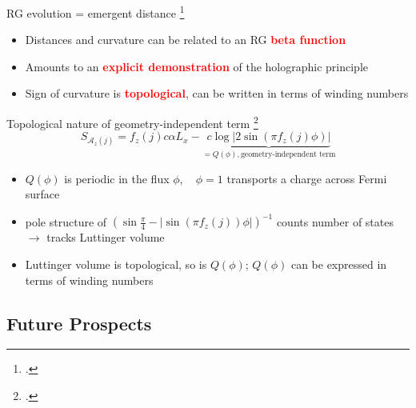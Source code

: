 \documentclass[10pt,aspectratio=169]{beamer}
\newcommand{\focus}[1]{\textcolor{red}{\bf{#1}}}
\begin{document}
\begin{frame}{RG evolution = emergent distance}
	\footcite{maldacena1999large,ryu2006aspects,holzhey_1994}
\begin{itemize}
	\item Distances and curvature can be related to an RG \focus{beta function}\\[10pt]
	\item Amounts to an \focus{explicit demonstration} of the holographic principle\\[10pt]
	\item Sign of curvature is \focus{topological}, can be written in terms of winding numbers\\[10pt]
\end{itemize}
	
\end{frame}

\begin{frame}{Topological nature of geometry-independent term}
	\footcite{luttinger1960ground,luttinger1960fermi,oshikawa2000topological,seki2017topological,anirbanurg1,Heath_2020}
	\[S_{\mathcal{A}_z(j)} = f_z(j) c \alpha L_x - \underbrace{c \log \big|2\sin\left(\pi f_z(j)\phi\right)\big|}_{=Q(\phi),\text{geometry-independent term}}\]
	\begin{itemize}
	\item \(Q(\phi)\) is periodic in the flux \(\phi\), ~ \(\phi=1\) transports a charge across Fermi surface\\[10pt]
	\item pole structure of \(\left(\sin \frac{\pi}{4} - |\sin\left(\pi f_z(j)\right)\phi|\right)^{-1}\) counts number of states \(\longrightarrow\) tracks Luttinger volume\\[10pt]
	\item Luttinger volume is topological, so is \(Q(\phi)\); \(Q(\phi)\) can be expressed in terms of winding numbers
	\end{itemize}
	
\end{frame}

\begin{frame}{}
\section{Future Prospects}
\end{frame}
\end{document}
